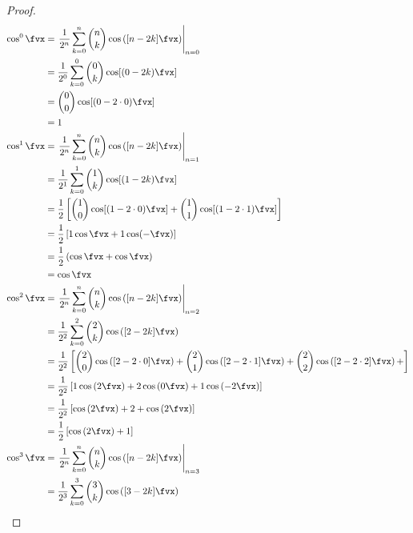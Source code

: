 \begin{proof}
\begin{align*}
  \cos^0\fvx
    &= \left.\frac{1}{2^n} \sum_{k=0}^n \binom{n}{k}\cos\left([n-2k]\fvx\right)\right|_{n=0}
  \\&= \frac{1}{2^0} \sum_{k=0}^0 \binom{0}{k}\cos[(0-2k)\fvx] 
  \\&= \binom{0}{0}\cos[(0-2\cdot0)\fvx] 
  \\&= 1
  \\
  \cos^1\fvx
    &= \left.\frac{1}{2^n} \sum_{k=0}^n \binom{n}{k}\cos\left([n-2k]\fvx\right)\right|_{n=1}
  \\&= \frac{1}{2^1} \sum_{k=0}^1 \binom{1}{k}\cos[(1-2k)\fvx] 
  \\&= \frac{1}{2}\left[ \binom{1}{0}\cos[(1-2\cdot0)\fvx] + \binom{1}{1}\cos[(1-2\cdot1)\fvx] \right]
  \\&= \frac{1}{2}\left[ 1\cos\fvx + 1\cos(-\fvx) \right]
  \\&= \frac{1}{2}\left( \cos\fvx + \cos\fvx \right)
  \\&= \cos\fvx
  \\
  \cos^2\fvx
    &= \left.\frac{1}{2^n} \sum_{k=0}^n \binom{n}{k}\cos\left([n-2k]\fvx\right)\right|_{n=2}
  \\&= \frac{1}{2^2} \sum_{k=0}^2 \binom{2}{k}\cos\left([2-2k]\fvx\right)
  \\&= \frac{1}{2^2}\left[ 
         \binom{2}{0}\cos\left([2-2\cdot0]\fvx\right) +
         \binom{2}{1}\cos\left([2-2\cdot1]\fvx\right) +
         \binom{2}{2}\cos\left([2-2\cdot2]\fvx\right) +
       \right]
  \\&= \frac{1}{2^2}\left[ 
         1\cos\left(2\fvx\right) +
         2\cos\left(0\fvx\right) +
         1\cos\left(-2\fvx\right) 
       \right]
  \\&= \frac{1}{2^2}\left[\cos\left(2\fvx\right) +  2 + \cos\left(2\fvx\right) \right]
  \\&= \frac{1}{2}\left[\cos\left(2\fvx\right) +  1\right]
  \\
  \cos^3\fvx
    &= \left.\frac{1}{2^n} \sum_{k=0}^n \binom{n}{k}\cos\left([n-2k]\fvx\right)\right|_{n=3}
  \\&= \frac{1}{2^3} \sum_{k=0}^3 \binom{3}{k}\cos\left([3-2k]\fvx\right)

\end{align*}
\end{proof}
